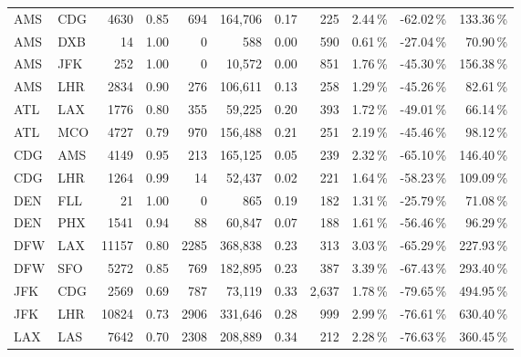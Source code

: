 \begin{landscape}
\begin{center}
\begin{tabular}{l l | r r r r r r r r r}
AMS  &  CDG  &  4630  &  0.85  &  694  &  164,706  &  0.17  &  225  &  2.44\,\%  &  -62.02\,\%  &  133.36\,\% \\
AMS  &  DXB  &  14  &  1.00  &  0  &  588  &  0.00  &  590  &  0.61\,\%  &  -27.04\,\%  &  70.90\,\% \\
AMS  &  JFK  &  252  &  1.00  &  0  &  10,572  &  0.00  &  851  &  1.76\,\%  &  -45.30\,\%  &  156.38\,\% \\
AMS  &  LHR  &  2834  &  0.90  &  276  &  106,611  &  0.13  &  258  &  1.29\,\%  &  -45.26\,\%  &  82.61\,\% \\
ATL  &  LAX  &  1776  &  0.80  &  355  &  59,225  &  0.20  &  393  &  1.72\,\%  &  -49.01\,\%  &  66.14\,\% \\
ATL  &  MCO  &  4727  &  0.79  &  970  &  156,488  &  0.21  &  251  &  2.19\,\%  &  -45.46\,\%  &  98.12\,\% \\
CDG  &  AMS  &  4149  &  0.95  &  213  &  165,125  &  0.05  &  239  &  2.32\,\%  &  -65.10\,\%  &  146.40\,\% \\
CDG  &  LHR  &  1264  &  0.99  &  14  &  52,437  &  0.02  &  221  &  1.64\,\%  &  -58.23\,\%  &  109.09\,\% \\
DEN  &  FLL  &  21  &  1.00  &  0  &  865  &  0.19  &  182  &  1.31\,\%  &  -25.79\,\%  &  71.08\,\% \\
DEN  &  PHX  &  1541  &  0.94  &  88  &  60,847  &  0.07  &  188  &  1.61\,\%  &  -56.46\,\%  &  96.29\,\% \\
DFW  &  LAX  &  11157  &  0.80  &  2285  &  368,838  &  0.23  &  313  &  3.03\,\%  &  -65.29\,\%  &  227.93\,\% \\
DFW  &  SFO  &  5272  &  0.85  &  769  &  182,895  &  0.23  &  387  &  3.39\,\%  &  -67.43\,\%  &  293.40\,\% \\
JFK  &  CDG  &  2569  &  0.69  &  787  &  73,119  &  0.33  &  2,637  &  1.78\,\%  &  -79.65\,\%  &  494.95\,\% \\
JFK  &  LHR  &  10824  &  0.73  &  2906  &  331,646  &  0.28  &  999  &  2.99\,\%  &  -76.61\,\%  &  630.40\,\% \\
LAX  &  LAS  &  7642  &  0.70  &  2308  &  208,889  &  0.34  &  212  &  2.28\,\%  &  -76.63\,\%  &  360.45\,\% \\

\end{tabular}
\end{center}
\end{landscape}
